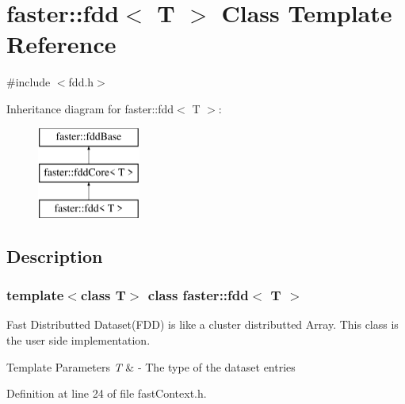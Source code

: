 \hypertarget{classfaster_1_1fdd}{}\section{faster\+:\+:fdd$<$ T $>$ Class Template Reference}
\label{classfaster_1_1fdd}


{\ttfamily \#include $<$fdd.\+h$>$}

Inheritance diagram for faster\+:\+:fdd$<$ T $>$\+:\begin{figure}[H]
\begin{center}
\leavevmode
\includegraphics[height=3.000000cm]{classfaster_1_1fdd}
\end{center}
\end{figure}


\subsection{Description}
\subsubsection*{template$<$class T$>$\newline
class faster\+::fdd$<$ T $>$}

Fast Distributted Dataset(\+F\+D\+D) is like a cluster distributted Array. This class is the user side implementation. 


\begin{DoxyTemplParams}{Template Parameters}
{\em T} & -\/ The type of the dataset entries \\
\hline
\end{DoxyTemplParams}


Definition at line 24 of file fast\+Context.\+h.

